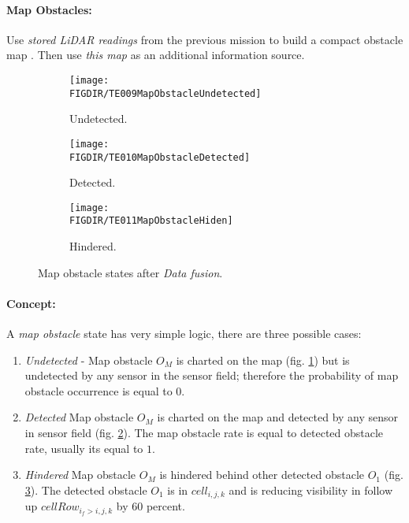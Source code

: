 \paragraph{Map Obstacles:} Use \emph{stored LiDAR readings} from the previous mission to build a compact obstacle map \cite{cernamaria2018}. Then use \emph{this map} as an additional information source.

\begin{figure}[H]
    \begin{subfigure}{0.32\textwidth}
        \texttt{[image: \\FIGDIR/TE009MapObstacleUndetected]} 
        \caption{Undetected.}
        \label{fig:undetectedMapObstalce}
    \end{subfigure}
    \begin{subfigure}{0.32\textwidth}
        \texttt{[image: \\FIGDIR/TE010MapObstacleDetected]} 
        \caption{Detected.}
        \label{fig:detectedMapObstacle}
    \end{subfigure}
    \begin{subfigure}{0.32\textwidth}
        \texttt{[image: \\FIGDIR/TE011MapObstacleHiden]}
        \caption{Hindered.}
        \label{fig:hinderedMapObstacle}
    \end{subfigure}
    \caption{Map obstacle states after \emph{Data fusion}.}
    \label{fig:mapObstacleStatesAfterDataFusion}
\end{figure}

\paragraph{Concept:} A \emph{map obstacle} state has very simple logic, there are three possible cases:

\begin{enumerate}
    \item \emph{Undetected} - Map obstacle $O_M$ is charted on the map (fig. \ref{fig:undetectedMapObstalce}) but is undetected by any sensor in the sensor field; therefore the probability of map obstacle occurrence is equal to $0$.


    \item \emph{Detected} Map obstacle $O_M$ is charted on the map and detected by any sensor in sensor field (fig. \ref{fig:detectedMapObstacle}). The map obstacle rate is equal to detected obstacle rate, usually its equal to $1$.

    \item \emph{Hindered} Map obstacle $O_M$ is hindered behind other detected obstacle $O_1$ (fig. \ref{fig:hinderedMapObstacle}). The detected obstacle $O_1$ is in $cell_{i,j,k}$ and is reducing visibility in follow up $cellRow_{i_f>i,j,k}$ by $60$ percent.
\end{enumerate}


